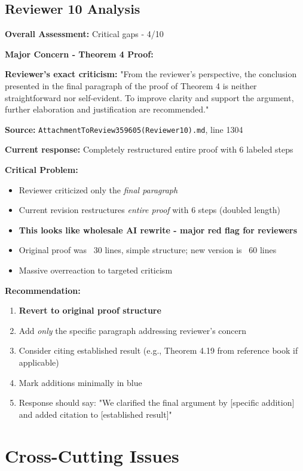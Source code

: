 \documentclass[11pt]{article}
\begin{document}
\subsection{Reviewer 10 Analysis}

\textbf{Overall Assessment:} \textcolor{critical}{Critical gaps - 4/10}

\textbf{Major Concern - Theorem 4 Proof:}

\textbf{Reviewer's exact criticism:} "From the reviewer's perspective, the conclusion presented in the final paragraph of the proof of Theorem 4 is neither straightforward nor self-evident. To improve clarity and support the argument, further elaboration and justification are recommended."

\textbf{Source:} \texttt{AttachmentToReview359605(Reviewer10).md}, line 1304

\textbf{Current response:} Completely restructured entire proof with 6 labeled steps

\textbf{\textcolor{critical}{Critical Problem:}}
\begin{itemize}[leftmargin=*]
\item Reviewer criticized only the \textit{final paragraph}
\item Current revision restructures \textit{entire proof} with 6 steps (doubled length)
\item \textbf{This looks like wholesale AI rewrite - major red flag for reviewers}
\item Original proof was ~30 lines, simple structure; new version is ~60 lines
\item Massive overreaction to targeted criticism
\end{itemize}

\textbf{Recommendation:}
\begin{enumerate}
\item \textbf{Revert to original proof structure}
\item Add \textit{only} the specific paragraph addressing reviewer's concern
\item Consider citing established result (e.g., Theorem 4.19 from reference book if applicable)
\item Mark additions minimally in blue
\item Response should say: "We clarified the final argument by [specific addition] and added citation to [established result]"
\end{enumerate}

\section{Cross-Cutting Issues}
\end{document}
